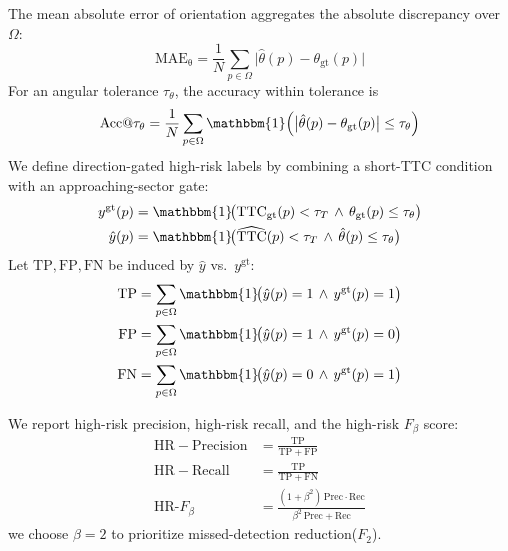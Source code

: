 \documentclass[journal]{IEEEtran}
\begin{document}
The mean absolute error of orientation aggregates the absolute discrepancy over \(\Omega\):
\begin{equation}
\label{eq:mae_ori}
\mathrm{MAE}_{\mathrm{\theta}}
=\frac{1}{N}\sum_{p\in\Omega}\big|\hat{\theta}(p)-\theta_{\mathrm{gt}}(p)\big|
\end{equation}
For an angular tolerance \(\tau_\theta\), the accuracy within tolerance is
\begin{equation}
\label{eq:acc_theta}
\mathrm{Acc@}\tau_\theta
=\frac{1}{N}\sum_{p\in\Omega}\mathbbm{1}\!\left(\big|\hat{\theta}(p)-\theta_{\mathrm{gt}}(p)\big|\le \tau_\theta\right)
\end{equation}
We define direction-gated high-risk labels by combining a short-TTC condition with an approaching-sector gate:
\begin{equation}
\label{eq:risk_indicators}
\begin{aligned}
y^{\mathrm{gt}}(p) &= \mathbbm{1}\!\big(\mathrm{TTC}_{\mathrm{gt}}(p) < \tau_T \,\land\, \theta_{\mathrm{gt}}(p) \le \tau_\theta\big)\\
\hat{y}(p)         &= \mathbbm{1}\!\big(\widehat{\mathrm{TTC}}(p) < \tau_T \,\land\, \hat{\theta}(p) \le \tau_\theta\big)
\end{aligned}
\end{equation}
Let \(\mathrm{TP},\mathrm{FP},\mathrm{FN}\) be induced by \(\hat{y}\) vs.\ \(y^{\mathrm{gt}}\):
\begin{equation}
\label{eq:confusion}
\begin{aligned}
\mathrm{TP} &= \sum_{p\in\Omega}\mathbbm{1}\!\big(\hat{y}(p)=1 \,\land\, y^{\mathrm{gt}}(p)=1\big)\\
\mathrm{FP} &= \sum_{p\in\Omega}\mathbbm{1}\!\big(\hat{y}(p)=1 \,\land\, y^{\mathrm{gt}}(p)=0\big)\\
\mathrm{FN} &= \sum_{p\in\Omega}\mathbbm{1}\!\big(\hat{y}(p)=0 \,\land\, y^{\mathrm{gt}}(p)=1\big)
\end{aligned}
\end{equation}

We report high-risk precision, high-risk recall, and the high-risk \(F_{\beta}\) score:
\begin{equation}
\label{eq:pr_hrf2}
\begin{aligned}
\mathrm{HR-Precision}   &= \frac{\mathrm{TP}}{\mathrm{TP}+\mathrm{FP}}\\
\mathrm{HR-Recall}    &= \frac{\mathrm{TP}}{\mathrm{TP}+\mathrm{FN}}\\
\mathrm{HR}\text{-}F_{\beta} &= \frac{(1+\beta^2)\,\mathrm{Prec}\cdot \mathrm{Rec}}{\beta^2\,\mathrm{Prec}+\mathrm{Rec}}
\end{aligned}
\end{equation}
we choose \(\beta=2\) to prioritize missed-detection reduction(\(F_2\)).   
\end{document}
